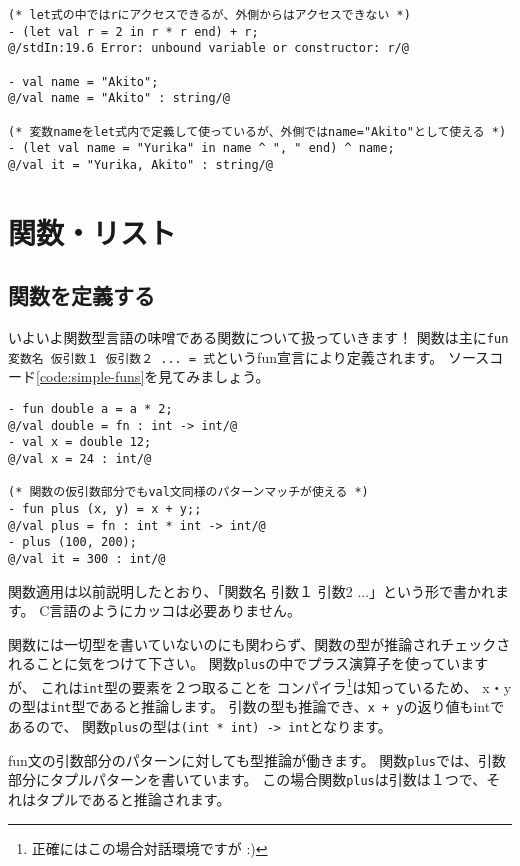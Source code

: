 \documentclass[11pt,a4paper]{article}
\begin{document}
\begin{lstlisting}[caption=let式のスコープ,label=code:let-scope]
(* let式の中ではrにアクセスできるが、外側からはアクセスできない *)
- (let val r = 2 in r * r end) + r;
@/stdIn:19.6 Error: unbound variable or constructor: r/@

- val name = "Akito";
@/val name = "Akito" : string/@

(* 変数nameをlet式内で定義して使っているが、外側ではname="Akito"として使える *)
- (let val name = "Yurika" in name ^ ", " end) ^ name;
@/val it = "Yurika, Akito" : string/@
\end{lstlisting}

\section{関数・リスト}
\subsection{関数を定義する}
いよいよ関数型言語の味噌である関数について扱っていきます！
関数は主に\lstinline{fun 変数名 仮引数１ 仮引数２ ... = 式}というfun宣言により定義されます。
ソースコード\ref{code:simple-funs}を見てみましょう。

\begin{lstlisting}[caption={単純な関数の定義},label={code:simple-funs}]
- fun double a = a * 2;
@/val double = fn : int -> int/@
- val x = double 12;
@/val x = 24 : int/@

(* 関数の仮引数部分でもval文同様のパターンマッチが使える *)
- fun plus (x, y) = x + y;;
@/val plus = fn : int * int -> int/@
- plus (100, 200);
@/val it = 300 : int/@
\end{lstlisting}

関数適用は以前説明したとおり、「関数名 引数１ 引数2 ...」という形で書かれます。
C言語のようにカッコは必要ありません。

関数には一切型を書いていないのにも関わらず、関数の型が推論されチェックされることに気をつけて下さい。
関数\lstinline{plus}の中でプラス演算子を使っていますが、
これは\lstinline{int}型の要素を２つ取ることを
コンパイラ\footnote{正確にはこの場合対話環境ですが :)}は知っているため、
x・yの型は\lstinline{int}型であると推論します。
引数の型も推論でき、\lstinline{x + y}の返り値もintであるので、
関数\lstinline{plus}の型は\lstinline{(int * int) -> int}となります。

fun文の引数部分のパターンに対しても型推論が働きます。
関数\lstinline{plus}では、引数部分にタプルパターンを書いています。
この場合関数\lstinline{plus}は引数は１つで、それはタプルであると推論されます。
\end{document}
